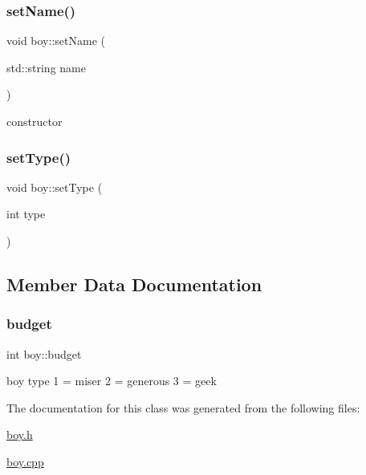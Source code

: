 \mbox{\label{classboy_a5d2297ec625c9ea85cac3987255380fc}} 
\subsubsection{\texorpdfstring{set\+Name()}{setName()}}
{\footnotesize\ttfamily void boy\+::set\+Name (\begin{DoxyParamCaption}\item[{std\+::string}]{name }\end{DoxyParamCaption})}



constructor 

\mbox{\label{classboy_a7e7af130f5dae098e9cc5b7f20cb5e0d}} 
\subsubsection{\texorpdfstring{set\+Type()}{setType()}}
{\footnotesize\ttfamily void boy\+::set\+Type (\begin{DoxyParamCaption}\item[{int}]{type }\end{DoxyParamCaption})}



\subsection{Member Data Documentation}
\mbox{\label{classboy_a80d6bd6642a612cf0428ab56a2098316}} 
\subsubsection{\texorpdfstring{budget}{budget}}
{\footnotesize\ttfamily int boy\+::budget}



boy type \textquotesingle{}1\textquotesingle{} = miser \textquotesingle{}2\textquotesingle{} = generous \textquotesingle{}3\textquotesingle{} = geek 



The documentation for this class was generated from the following files\+:\begin{DoxyCompactItemize}
\item 
\hyperlink{boy_8h}{boy.\+h}\item 
\hyperlink{boy_8cpp}{boy.\+cpp}\end{DoxyCompactItemize}
